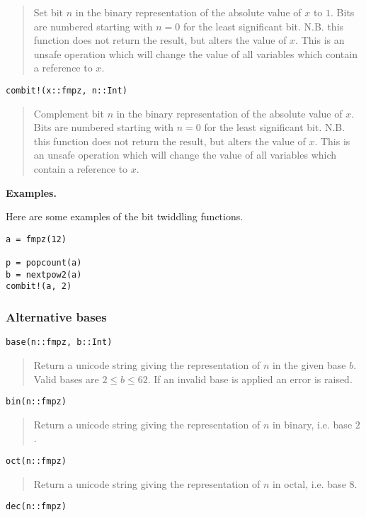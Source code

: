\documentclass[a4paper,10pt]{article}
\newcommand{\desc}[1]{\vspace{-3mm}\begin{quote}#1\end{quote}}
\begin{document}
{{\desc{Set bit $n$ in the binary representation of the absolute value of $x$ to $1$. Bits
are numbered starting with $n = 0$ for the least significant bit. N.B. this function does
not return the result, but alters the value of $x$. This is an unsafe operation which will
change the value of all variables which contain a reference to $x$.}

\begin{lstlisting}
combit!(x::fmpz, n::Int)
\end{lstlisting}

\desc{Complement bit $n$ in the binary representation of the absolute value of $x$. Bits
are numbered starting with $n = 0$ for the least significant bit. N.B. this function does
not return the result, but alters the value of $x$. This is an unsafe operation which will
change the value of all variables which contain a reference to $x$.}

\textbf{Examples.}

Here are some examples of the bit twiddling functions.

\begin{lstlisting}
a = fmpz(12)

p = popcount(a)
b = nextpow2(a)
combit!(a, 2)
\end{lstlisting}

\subsubsection{Alternative bases}

\begin{lstlisting}
base(n::fmpz, b::Int)
\end{lstlisting}

\desc{Return a unicode string giving the representation of $n$ in the given base $b$. Valid
bases are $2 \leq b \leq 62$. If an invalid base is applied an error is raised.}

\begin{lstlisting}
bin(n::fmpz)
\end{lstlisting}

\desc{Return a unicode string giving the representation of $n$ in binary, i.e. base $2$.}

\begin{lstlisting}
oct(n::fmpz)
\end{lstlisting}

\desc{Return a unicode string giving the representation of $n$ in octal, i.e. base $8$.}

\begin{lstlisting}
dec(n::fmpz)
\end{lstlisting}

}}
\end{document}
